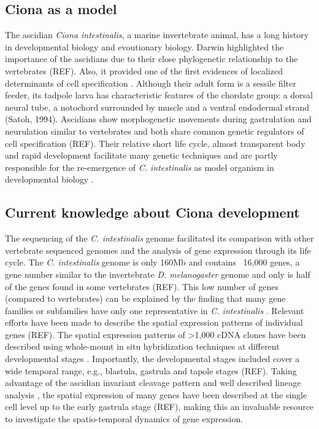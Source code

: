 \subsection{Ciona as a model}
	The ascidian \textit{Ciona intestinalis}, a marine invertebrate animal, has a long history in developmental biology and evoutionary biology. 
	Darwin highlighted the importance of the ascidians due to their  close phylogenetic relationship to the vertebrates (REF). 
	Also, it provided one of the first evidences of localized determinants of cell specification \citep{Conklin1905}. 
	Although their adult form is a sessile filter feeder, its tadpole larva has characteristic features of the chordate group: a dorsal neural tube, a notochord surrounded by muscle and a ventral endodermal strand (Satoh, 1994).
	Ascidians show morphogenetic movements during gastrulation and neurulation similar to vertebrates and both share common genetic regulators of cell specification (REF).
	Their relative short life cycle, almost transparent body and rapid development facilitate many genetic techniques and are partly responsible for the re-emergence of \textit{C. intestinalis} as model organism in developmental biology \citep{Levin2012}.
	
\subsection{Current knowledge about Ciona development}
	The sequencing of the \textit{C. intestinalis} genome \citep{Dehal2002} facilitated its comparison with other vertebrate sequenced genomes and the analysis of gene expression through its life cycle.
	The \textit{C. intestinalis} genome is only 160Mb and contains ~16,000 genes, a gene number similar to the invertebrate \textit{D. melanogaster} genome and only is half of the genes found in some vertebrates (REF).
	This low number of genes (compared to vertebrates) can be explained by the finding that many gene families or subfamilies have only one representative in \textit{C. intestinalis} \citep{Dehal2002}.
	Relevant efforts have been made to describe the spatial expression patterns of individual genes (REF).
	The spatial expression patterns of  >1,000 cDNA clones have been described using whole-mount in situ hybridization techniques at different developmental stages \citep{Imai2004}.
	 Importantly, the developmental stages included cover a wide temporal range, e.g., blastula, gastrula and tapole stages (REF).
	 Taking advantage of the ascidian invariant cleavage pattern and well described lineage analysis \citep{Conklin1905,Nishida1987}, the spatial expression of many genes have been described at the single cell level up to the early gastrula stage (REF), making this an invaluable resource to investigate the spatio-temporal dynamics of gene expression.

